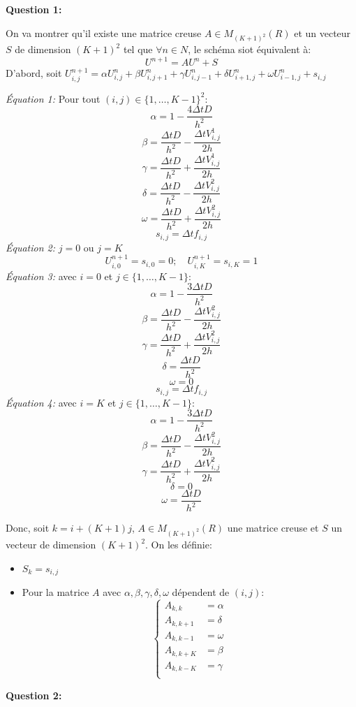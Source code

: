 \documentclass[
  11pt,
  dvipsnames]{article}
\providecommand{\tightlist}{%
  \setlength{\itemsep}{0pt}\setlength{\parskip}{0pt}}
\begin{document}
\textbf{Question 1:}

On va montrer qu'il existe une matrice creuse \(A \in M_{(K+1)^2}(R)\) et un vecteur \(S\) de dimension \((K+1)^2\) tel que \(\forall n \in N\), le schéma siot équivalent à:
\[ U^{n+1} = AU^n + S\]
D'abord, soit \(U_{i,j}^{n+1}= \alpha U_{i,j}^{n} + \beta U_{i,j+1}^{n} + \gamma U_{i,j-1}^{n} + \delta U_{i+1,j}^{n} + \omega U_{i-1,j}^{n} + s_{i,j}\)

\emph{Équation 1:} Pour tout \((i,j) \in \{1, \dots, K-1\}^2\):
\[\alpha = 1-\frac{4\Delta tD}{h^2}\]
\[\beta = \frac {\Delta t D}{h^2}-\frac {\Delta t V_{i,j}^1}{2h}\]
\[\gamma = \frac {\Delta t D}{h^2}+\frac {\Delta t V_{i,j}^1}{2h}\]
\[\delta = \frac {\Delta t D}{h^2}-\frac {\Delta t V_{i,j}^2}{2h}\]
\[\omega = \frac {\Delta t D}{h^2}+\frac {\Delta t V_{i,j}^2}{2h}\]
\[s_{i,j}=\Delta t f_{i,j}\]
\emph{Équation 2:} \(j= 0\) ou \(j=K\)
\[U_{i,0}^{n+1} = s_{i,0} = 0; \quad U_{i,K}^{n+1} = s_{i,K} = 1\]
\emph{Équation 3:} avec \(i = 0\) et \(j \in \{1, \dots, K-1\}\):
\[\alpha = 1-\frac{3\Delta tD}{h^2}\]
\[\beta = \frac {\Delta t D}{h^2}-\frac {\Delta t V_{i,j}^2}{2h}\]
\[\gamma =\frac {\Delta t D}{h^2}+\frac {\Delta t V_{i,j}^2}{2h}\]
\[\delta = \frac {\Delta t D}{h^2}\]
\[\omega =0\]
\[s_{i,j}=\Delta t f_{i,j}\]
\emph{Équation 4:} avec \(i = K\) et \(j \in \{1, \dots, K-1\}\):
\[\alpha = 1-\frac{3\Delta tD}{h^2}\]
\[\beta = \frac {\Delta t D}{h^2}-\frac {\Delta t V_{i,j}^2}{2h}\]
\[\gamma =\frac {\Delta t D}{h^2}+\frac {\Delta t V_{i,j}^2}{2h}\]
\[\delta =0\]
\[\omega = \frac {\Delta t D}{h^2}\]

Donc, soit \(k = i + (K+1)j\), \(A \in M_{(K+1)^2}(R)\) une matrice creuse et \(S\) un vecteur de dimension \((K+1)^2\). On les définie:

\begin{itemize}
\tightlist
\item
  \(S_k = s_{i,j}\)
\item
  Pour la matrice \(A\) avec \(\alpha ,\beta,\gamma,\delta,\omega\) dépendent de \((i,j)\):
  \[\begin{cases}
  A_{k,k} &= \alpha\\
  A_{k,k+1} &= \delta\\
  A_{k,k-1} &= \omega\\
  A_{k,k+K} &= \beta\\
  A_{k,k-K} &= \gamma\\
  \end{cases}\]
\end{itemize}

\textbf{Question 2:}
\end{document}
